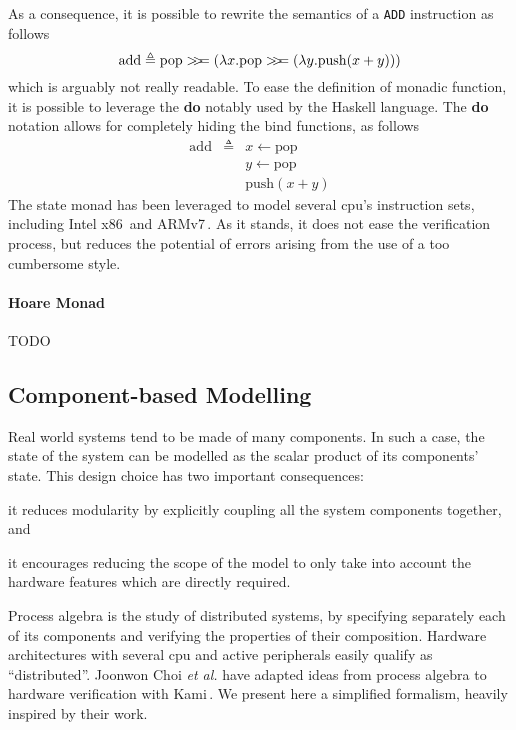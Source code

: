 As a consequence, it is possible to rewrite the semantics of a \texttt{ADD}
instruction as follows
%
\[
  \mathrm{add} \triangleq \mathrm{pop}
  \bind (\lambda x. \mathrm{pop}
  \bind (\lambda y. \mathrm{push}(x + y)))
\]
%
which is arguably not really readable.
%
To ease the definition of monadic function, it is possible to leverage the
\textbf{do} notably used by the Haskell language.
%
The \textbf{do} notation allows for completely hiding the $\mathrm{bind}$
functions, as follows
%
\[
  \begin{array}{rcl}
    \mathrm{add} &\triangleq& x \leftarrow \mathrm{pop} \\
                 &          & y \leftarrow \mathrm{pop} \\
                 &          & \mathrm{push}(x + y)
  \end{array}
\]
%
The state monad has been leveraged to model several \ac{cpu}'s instruction sets,
including Intel x86\,\cite{morrisett2012rocksalt} and
ARMv7\,\cite{fox2010armv7}.
%
As it stands, it does not ease the verification process, but reduces the
potential of errors arising from the use of a too cumbersome style.

\paragraph{Hoare Monad}
%
TODO

\subsection{Component-based Modelling}

Real world systems tend to be made of many components.
%
In such a case, the state of the system can be modelled as the scalar product of
its components' state.
%
This design choice has two important consequences:
%
\begin{inparaenum}[(1)]
%
\item it reduces modularity by explicitly coupling all the system components
  together, and
%
\item it encourages reducing the scope of the model to only take into account
  the hardware features which are directly required.
%
\end{inparaenum}

Process algebra is the study of distributed systems, by specifying separately
each of its components and verifying the properties of their composition.
%
Hardware architectures with several \ac{cpu} and active peripherals easily
qualify as ``distributed''.
%
Joonwon Choi \emph{et al.} have adapted ideas from process algebra to hardware
verification with Kami\,\cite{choi2017kami}.
%
We present here a simplified formalism, heavily inspired by their work.

